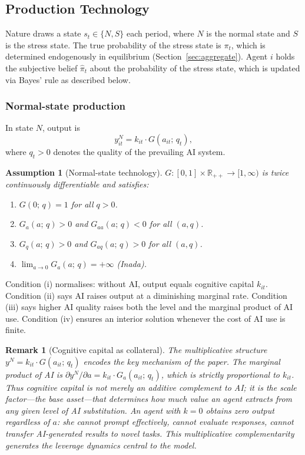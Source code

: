 \documentclass[12pt]{article}
\newtheorem{assumption}{Assumption}
\newtheorem{remark}{Remark}
\newcommand{\R}{\mathbb{R}}
\newcommand{\hpi}{\hat{\pi}}
\begin{document}
\subsection{Production Technology}
\label{sec:production}

Nature draws a state $s_{t} \in \{N, S\}$ each period, where $N$ is the normal state
and $S$ is the stress state. The true probability of the stress state is $\pi_t$,
which is determined endogenously in equilibrium (Section~\ref{sec:aggregate}).
Agent $i$ holds the subjective belief $\hpi_{t}$ about the probability of the stress
state, which is updated via Bayes' rule as described below.

\subsubsection*{Normal-state production}

In state $N$, output is
\begin{equation}
y_{it}^{N} = k_{it} \cdot G(a_{it};\, q_t),
\label{eq:yN}
\end{equation}
where $q_t > 0$ denotes the quality of the prevailing AI system.

\begin{assumption}[Normal-state technology]
\label{ass:G}
$G : [0,1] \times \R_{++} \to [1,\infty)$ is twice continuously differentiable
and satisfies:
\begin{enumerate}
\item[\emph{(i)}] $G(0;\, q) = 1$ for all $q > 0$.
\item[\emph{(ii)}] $G_a(a;\, q) > 0$ and $G_{aa}(a;\, q) < 0$ for all $(a, q)$.
\item[\emph{(iii)}] $G_q(a;\, q) > 0$ and $G_{aq}(a;\, q) > 0$ for all $(a, q)$.
\item[\emph{(iv)}] $\lim_{a \to 0} G_a(a;\, q) = +\infty$ \emph{(Inada)}.
\end{enumerate}
\end{assumption}

Condition (i) normalises: without AI, output equals cognitive capital $k_{it}$.
Condition (ii) says AI raises output at a diminishing marginal rate. Condition (iii)
says higher AI quality raises both the level and the marginal product of AI use.
Condition (iv) ensures an interior solution whenever the cost of AI use is finite.

\begin{remark}[Cognitive capital as collateral]
\label{rem:collateral}
The multiplicative structure $y^N = k_{it} \cdot G(a_{it};\, q_t)$ encodes the key
mechanism of the paper. The marginal product of AI is
$\partial y^N / \partial a = k_{it} \cdot G_a(a_{it};\, q_t)$,
which is strictly proportional to $k_{it}$. Thus cognitive capital is not merely
an additive complement to AI; it is the \emph{scale factor}---the base asset---that
determines how much value an agent extracts from any given level of AI substitution.
An agent with $k = 0$ obtains zero output regardless of $a$: she cannot prompt
effectively, cannot evaluate responses, cannot transfer AI-generated results to novel
tasks. This multiplicative complementarity generates the leverage dynamics central to
the model.
\end{remark}
\end{document}
